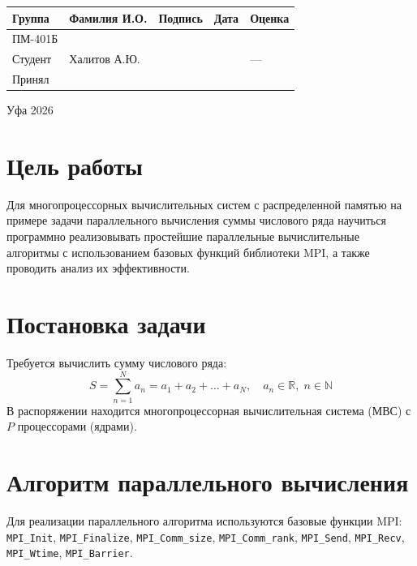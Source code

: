\begin{titlepage}
		\vfill
		\vspace{1cm}
		\noindent
		\begin{table}[H]
			\hspace{-0.8cm}
			\renewcommand{\arraystretch}{1.5} 
			\begin{tabular}{|C{3.1cm}|C{4cm}|C{2.4cm}|C{2.2cm}|C{3.2cm}|}
				\hline
				Группа & Фамилия И.О. & Подпись & Дата & Оценка \\ \hline
				ПМ-401Б & & & & \\ \hline
				Студент & Халитов А.Ю. & & & --- \\ \hline
				Принял &  & & & \\ \hline
			\end{tabular}
		\end{table}
		\vspace{0.25cm}
		Уфа 2026
	\end{titlepage}
	
	\section{Цель работы}
	Для многопроцессорных вычислительных систем с распределенной памятью на примере задачи параллельного вычисления суммы числового ряда научиться программно реализовывать простейшие параллельные вычислительные алгоритмы с использованием базовых функций библиотеки MPI, а также проводить анализ их эффективности.
	
	\section{Постановка задачи}
	Требуется вычислить сумму числового ряда:
	\[
	S = \sum_{n=1}^{N} a_n = a_1 + a_2 + \dots + a_N, \quad a_n \in \mathbb{R}, \; n \in \mathbb{N}
	\]
	В распоряжении находится многопроцессорная вычислительная система (МВС) с $P$ процессорами (ядрами).
	
	\section{Алгоритм параллельного вычисления}
	Для реализации параллельного алгоритма используются базовые функции MPI:
	\texttt{MPI\_Init}, \texttt{MPI\_Finalize}, \texttt{MPI\_Comm\_size}, \texttt{MPI\_Comm\_rank}, \texttt{MPI\_Send}, \texttt{MPI\_Recv}, \texttt{MPI\_Wtime}, \texttt{MPI\_Barrier}.
	
